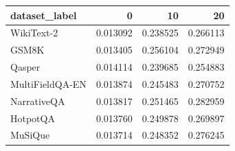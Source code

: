 \begin{tabular}{lrrr}
\toprule
dataset_label & 0 & 10 & 20 \\
\midrule
WikiText-2 & 0.013092 & 0.238525 & 0.266113 \\
GSM8K & 0.013405 & 0.256104 & 0.272949 \\
Qasper & 0.014114 & 0.239685 & 0.254883 \\
MultiFieldQA-EN & 0.013874 & 0.245483 & 0.270752 \\
NarrativeQA & 0.013817 & 0.251465 & 0.282959 \\
HotpotQA & 0.013760 & 0.249878 & 0.269897 \\
MuSiQue & 0.013714 & 0.248352 & 0.276245 \\
\bottomrule
\end{tabular}
